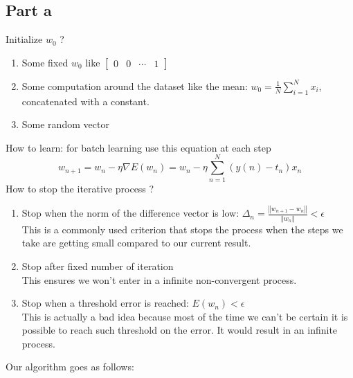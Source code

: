 \documentclass[a4paper, 10pt]{article}
\begin{document}
\subsection{Part a}
Initialize $w_0$ ?
\begin{enumerate}
    \item Some fixed $w_0$ like $\begin{bmatrix}0 & 0 & \cdots & 1\end{bmatrix}$
    \item Some computation around the dataset like the mean: $w_0 = \frac{1}{N}\sum_{i=1}^N x_i$, concatenated with a constant.
    \item Some random vector
\end{enumerate}
How to learn: for batch learning use this equation at each step
$$
w_{n+1} = w_n - \eta \nabla E(w_n) = w_n - \eta \sum_{n=1}^{N}\left(y(n)-t_n\right)x_n
$$
How to stop the iterative process ?
\begin{enumerate}
\item Stop when the norm of the difference vector is low: $\Delta_n = \frac{\left\Vert w_{n+1} - w_n\right\Vert}{\left\Vert w_n \right\Vert} < \epsilon$
\\
This is a commonly used criterion that stops the process when the steps we take are getting small compared to our current result.
\item Stop after fixed number of iteration
\\
This ensures we won't enter in a infinite non-convergent process. 
\item Stop when a threshold error is reached: $E(w_n) < \epsilon $
\\
This is actually a bad idea because most of the time we can't be certain it is possible to reach such threshold on the error.
It would result in an infinite process.
\end{enumerate}
Our algorithm goes as follows:
\end{document}
